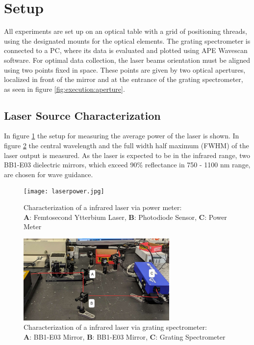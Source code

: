 \section{Setup}
\label{sec:setup}
All experiments are set up on an optical table with a grid of positioning threads, using the designated mounts for the optical elements.
The grating spectrometer is connected to a PC, where its data is evaluated and plotted using APE Wavescan software. 
For optimal data collection, the laser beams orientation must be aligned using two points fixed in space.
These points are given by two optical apertures, localized in front of the mirror and at the entrance of the grating spectrometer, as seen in figure \ref{fig:execution:aperture}.

\subsection{Laser Source Characterization}
\noindent In figure \ref{fig:setup:power} the setup for measuring the average power of the laser is shown.
In figure \ref{fig:setup:basic} the central wavelength and the full width half maximum (FWHM) of the laser output is measured.
As the laser is expected to be in the infrared range, two BB1-E03 dielectric mirrors, which exceed 90\% reflectance in 750 - 1100 nm range, are chosen for wave guidance.


\begin{figure}[H]
    \centering
    \captionsetup{margin=3cm}
    \texttt{[image: laserpower.jpg]}
    \caption{
        Characterization of a infrared laser via power meter: \\
        \textbf{A}: Femtosecond Ytterbium Laser, 
        \textbf{B}: Photodiode Sensor,
        \textbf{C}: Power Meter
    }
    \label{fig:setup:power}
\end{figure}
\begin{figure}[H]
    \centering
    \captionsetup{margin=3cm}
    \includegraphics[width=0.7\textwidth]{graphics/basic-setup1.jpg}
    \caption{
        Characterization of a infrared laser via grating spectrometer: \\
        \textbf{A}: BB1-E03 Mirror,
        \textbf{B}: BB1-E03 Mirror,
        \textbf{C}: Grating Spectrometer
        }
        \label{fig:setup:basic}
    \end{figure}
    
